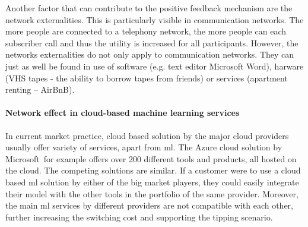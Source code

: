 Another factor that can contribute to the positive feedback mechanism are the network externalities. This is particularly visible in communication networks. The more people are connected to a telephony network, the more people can each subscriber call and thus the utility is increased for all participants\footnotemark. However, the networks externalities do not only apply to communication networks. They can just as well be found in use of software (e.g. text editor Microsoft Word), harware (VHS tapes - the ability to borrow tapes from friends) or services (apartment renting -- AirBnB).
% 
% 

\paragraph{Network effect in cloud-based machine learning services} In current market practice, cloud based solution by the major cloud providers usually offer variety of services, apart from \acrshort{ml}. The Azure cloud solution by Microsoft\footnotemark~for example offers over 200 different tools and products, all hosted on the cloud. The competing solutions are similar. If a customer were to use a cloud based \acrshort{ml} solution by either of the big market players, they could easily integrate their model with the other tools in the portfolio of the same provider.
% 
% 
Moreover, the main \acrshort{ml} services by different providers are not compatible with each other, further increasing the switching cost and supporting the tipping scenario\footnotemark.
% 
